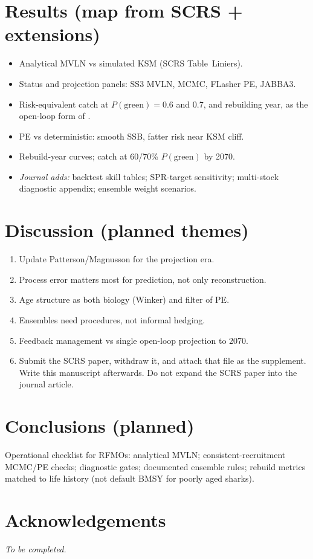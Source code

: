 \documentclass[11pt,a4paper]{article}
\newcommand{\PG}{P(\mathrm{green})}
\begin{document}
\section{Results (map from SCRS + extensions)}

\begin{itemize}[leftmargin=*]
  \item Analytical MVLN vs simulated KSM (SCRS Table~Liniers).
  \item Status and projection panels: SS3 MVLN, MCMC, FLasher PE, JABBA3.
  \item Risk-equivalent catch at $\PG = 0.6$ and $0.7$, and rebuilding year,
    as the open-loop form of \citet{Fischer2023}.
  \item PE vs deterministic: smooth SSB, fatter risk near KSM cliff.
  \item Rebuild-year curves; catch at 60/70\% $\PG$ by 2070.
  \item \textit{Journal adds:} backtest skill tables; SPR-target sensitivity;
    multi-stock diagnostic appendix; ensemble weight scenarios.
\end{itemize}

\section{Discussion (planned themes)}

\begin{enumerate}[leftmargin=*]
  \item Update Patterson/Magnusson for the projection era.
  \item Process error matters most for prediction, not only reconstruction.
  \item Age structure as both biology (Winker) and filter of PE.
  \item Ensembles need procedures, not informal hedging.
  \item Feedback management vs single open-loop projection to 2070.
  \item Submit the SCRS paper, withdraw it, and attach that file as the
    supplement. Write this manuscript afterwards. Do not expand the SCRS
    paper into the journal article.
\end{enumerate}

\section{Conclusions (planned)}

Operational checklist for RFMOs: analytical MVLN; consistent-recruitment
MCMC/PE checks; diagnostic gates; documented ensemble rules; rebuild metrics
matched to life history (not default BMSY for poorly aged sharks).

\section*{Acknowledgements}
\textit{To be completed.}



\end{document}
